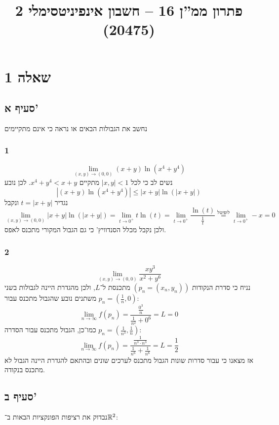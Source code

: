 
\title{פתרון ממ''ן 16 – חשבון אינפיניטסימלי 2 (20475)}


\maketitle
\maketitleprint{}

\section{שאלה 1}
\subsection{סעיף א'}
נחשב את הגבולות הבאים או נראה כי אינם מתקיימים

\subsubsection{1}
\[
	\lim_{(x, y) \to (0, 0)} (x + y) \ln(x^4 + y^4)
\]
נשים לב כי לכל $|x, y| < 1$ מתקיים $x^4 + y^4 < x + y$.
לכן נובע
\[
	|(x + y) \ln(x^4 + y^4)| \le |x + y| \ln(|x + y|)
\]
נגדיר $t = |x + y|$ ונקבל
\[
	\lim_{(x, y) \to (0, 0)} |x + y| \ln(|x + y|)
	= \lim_{t \to 0^+} t \ln(t)
	= \lim_{t \to 0^+} \frac{\ln(t)}{\frac{1}{t}}
	\overset{\text{לופיטל}}{=} \lim_{t \to 0^+} -x
	= 0
\]
ולכן נקבל מכלל הסנדוויץ' כי גם הגבול המקורי מתכנס לאפס.

\subsubsection{2}
\[
	\lim_{(x, y) \to (0, 0)} \frac{xy^3}{x^2 + y^6}
\]
נניח כי סדרת הנקודות $(p_n = (x_n, y_n))$ מתכנסת ל־$L$,
ולכן מהגדרת היינה לגבולות בשני משתנים נובע שהגבול מתכנס עבור $p_n = (\frac{1}{n}, 0)$:
\[
	\lim_{n \to \infty} f(p_n)
	= \frac{\frac{0^3}{n}}{\frac{1}{n^2} + 0^6}
	= L = 0
\]
כמו־כן, הגבול מתכנס עבור הסדרה $p_n = (\frac{1}{n^3}, \frac{1}{n})$:
\[
	\lim_{n \to \infty} f(p_n)
	= \frac{\frac{1}{n^3 \cdot n^3}}{\frac{1}{n^6} + \frac{1}{n^6}}
	= L = \frac{1}{2}
\]
אז מצאנו כי עבור סדרות שונות הגבול מתכנס לערכים שונים ובהתאם להגדרת היינה הגבול לא מתכנס בנקודה.

\subsection{סעיף ב'}
נבדוק את רציפות הפונקציות הבאות ב־$\mathbb{R}^2$:

